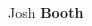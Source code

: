 \documentclass[
	10pt, %
]{FreemanCV}
\begin{document}
\begin{paracol}{2} %


\parbox[][0.05\textheight][c]{\linewidth}{ %
	\centering %
	
	{\sffamily\Huge Josh \textbf{Booth}} %
	
	\medskip %
	
	
	\vfill %
}









\end{paracol}
\end{document}
